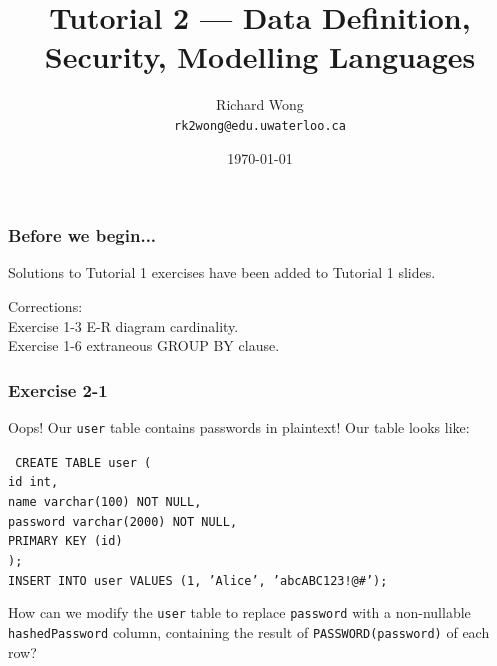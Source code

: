 

\title{Tutorial 2 --- Data Definition, Security, Modelling Languages}

\author{Richard Wong \\ \small \texttt{rk2wong@edu.uwaterloo.ca}}
\date{\today}




\begin{frame}
  \titlepage

\end{frame}


\begin{frame}
\frametitle{Before we begin...}

Solutions to Tutorial 1 exercises have been added to Tutorial 1 slides.

Corrections: \\
Exercise 1-3 E-R diagram cardinality. \\
Exercise 1-6 extraneous GROUP BY clause.

\end{frame}


\begin{frame}
\frametitle{Exercise 2-1}

Oops! Our \texttt{user} table contains passwords in plaintext! Our table looks like:

\texttt{
  CREATE TABLE user ( \\
    id int, \\
    name varchar(100) NOT NULL, \\
    password varchar(2000) NOT NULL, \\
    PRIMARY KEY (id) \\
  ); \\
  INSERT INTO user VALUES (1, 'Alice', 'abcABC123!@\#');
}

How can we modify the \texttt{user} table to replace \texttt{password} with a non-nullable \texttt{hashedPassword} column, containing the result of \texttt{PASSWORD(password)} of each row?

\end{frame}


